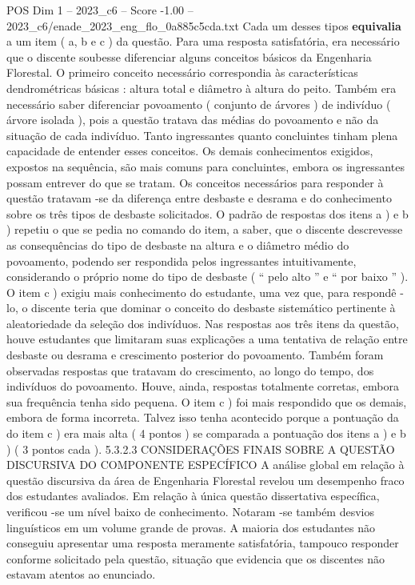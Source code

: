 \begin{textsample}{POS Dim 1 – 2023\_c6 – Score -1.00 – 2023\_c6/enade\_2023\_eng\_flo\_0a885c5cda.txt}
Cada um desses tipos \textbf{equivalia} a um item ( a, b e c ) da questão.
Para uma resposta satisfatória, era necessário que o discente soubesse diferenciar alguns conceitos básicos da Engenharia Florestal.
O primeiro conceito necessário correspondia às características dendrométricas básicas : altura total e diâmetro à altura do peito.
Também era necessário saber diferenciar povoamento ( conjunto de árvores ) de indivíduo ( árvore isolada ), pois a questão tratava das médias do povoamento e não da situação de cada indivíduo.
Tanto ingressantes quanto concluintes tinham plena capacidade de entender esses conceitos.
Os demais conhecimentos exigidos, expostos na sequência, são mais comuns para concluintes, embora os ingressantes possam entrever do que se tratam.
Os conceitos necessários para responder à questão tratavam -se da diferença entre desbaste e desrama e do conhecimento sobre os três tipos de desbaste solicitados.
O padrão de respostas dos itens a ) e b ) repetiu o que se pedia no comando do item, a saber, que o discente descrevesse as consequências do tipo de desbaste na altura e o diâmetro médio do povoamento, podendo ser respondida pelos ingressantes intuitivamente, considerando o próprio nome do tipo de desbaste ( “ pelo alto ” e “ por baixo ” ).
O item c ) exigiu mais conhecimento do estudante, uma vez que, para respondê -lo, o discente teria que dominar o conceito do desbaste sistemático pertinente à aleatoriedade da seleção dos indivíduos.
Nas respostas aos três itens da questão, houve estudantes que limitaram suas explicações a uma tentativa de relação entre desbaste ou desrama e crescimento posterior do povoamento.
Também foram observadas respostas que tratavam do crescimento, ao longo do tempo, dos indivíduos do povoamento.
Houve, ainda, respostas totalmente corretas, embora sua frequência tenha sido pequena.
O item c ) foi mais respondido que os demais, embora de forma incorreta.
Talvez isso tenha acontecido porque a pontuação da do item c ) era mais alta ( 4 pontos ) se comparada a pontuação dos itens a ) e b ) ( 3 pontos cada ). 5.3.2.3 CONSIDERAÇÕES FINAIS SOBRE A QUESTÃO DISCURSIVA DO COMPONENTE ESPECÍFICO A análise global em relação à questão discursiva da área de Engenharia Florestal revelou um desempenho fraco dos estudantes avaliados.
Em relação à única questão dissertativa específica, verificou -se um nível baixo de conhecimento.
Notaram -se também desvios linguísticos em um volume grande de provas.
A maioria dos estudantes não conseguiu apresentar uma resposta meramente satisfatória, tampouco responder conforme solicitado pela questão, situação que evidencia que os discentes não estavam atentos ao enunciado.

\end{textsample}
